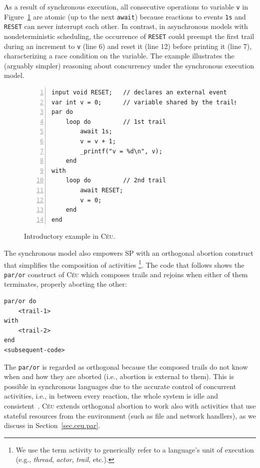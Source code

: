 \documentclass{acm_proc_article-sp}
\newcommand{\CEU}{\textsc{C\'{e}u}\xspace}
\newcommand{\code}[1] {{\small{\texttt{#1}}}}
\newcommand{\1}{\;}
\newcommand{\2}{\;\;}
\newcommand{\3}{\;\;\;}
\newcommand{\5}{\;\;\;\;\;}
\begin{document}
As a result of synchronous execution, all consecutive operations to variable 
\code{v} in Figure~\ref{lst.intro} are atomic (up to the next \code{await}) 
because reactions to events \code{1s} and \code{RESET} can never interrupt each 
other.
%
In contrast, in asynchronous models with nondeterministic scheduling, the 
occurrence of \code{RESET} could preempt the first trail during an increment to 
\code{v} (line 6) and reset it (line 12) before printing it (line 7), 
characterizing a race condition on the variable.
%
The example illustrates the (arguably simpler) reasoning about concurrency 
under the synchronous execution model.

\begin{figure}[t]
\begin{lstlisting}[numbers=left,xleftmargin=3em]
input void RESET;   // declares an external event
var int v = 0;      // variable shared by the trails
par do
    loop do         // 1st trail
        await 1s;
        v = v + 1;
        _printf("v = %d\n", v);
    end
with
    loop do         // 2nd trail
        await RESET;
        v = 0;
    end
end
\end{lstlisting}
\caption{ Introductory example in \CEU.
\label{lst.intro}
}
\end{figure}


The synchronous model also empowers SP with an orthogonal abortion construct 
that simplifies the composition of activities%
\footnote{We use the term activity to generically refer to a language's unit of 
execution (e.g., \emph{thread}, \emph{actor}, \emph{trail}, etc.).}.
%
%
The code that follows shows the \code{par/or} construct of \CEU which composes 
trails and rejoins when either of them terminates, properly aborting the other:

\begin{lstlisting}
par/or do
    <trail-1>
with
    <trail-2>
end
<subsequent-code>
\end{lstlisting}

The \code{par/or} is regarded as orthogonal because the composed trails do not 
know when and how they are aborted (i.e., abortion is external to them).
%
This is possible in synchronous languages due to the accurate control of 
concurrent activities, i.e., in between every reaction, the whole system is 
idle and consistent~\cite{esterel.preemption}.
%
\CEU extends orthogonal abortion to work also with activities that use stateful 
resources from the environment (such as file and network handlers), as we 
discuss in Section~\ref{sec.ceu.par}.
\end{document}
